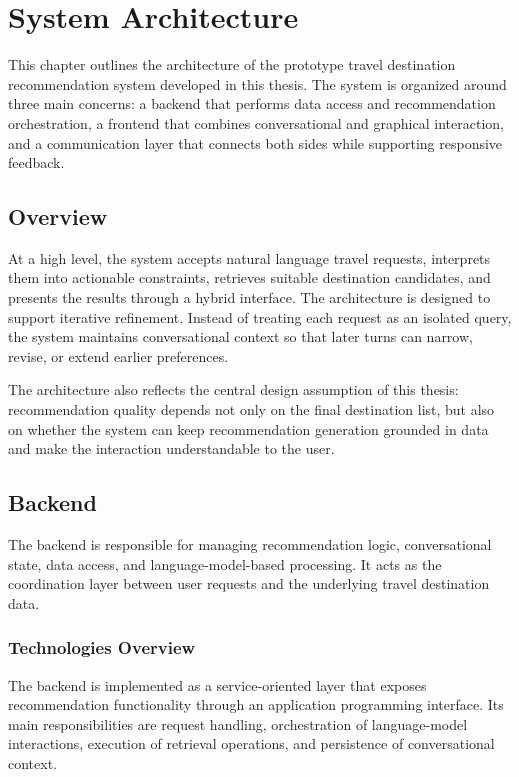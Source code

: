 
\chapter{System Architecture}\label{chapter:system-architecture}

This chapter outlines the architecture of the prototype travel destination recommendation system developed in this thesis. The system is organized around three main concerns: a backend that performs data access and recommendation orchestration, a frontend that combines conversational and graphical interaction, and a communication layer that connects both sides while supporting responsive feedback.

\section{Overview}\label{section:system-architecture:overview}
At a high level, the system accepts natural language travel requests, interprets them into actionable constraints, retrieves suitable destination candidates, and presents the results through a hybrid interface. The architecture is designed to support iterative refinement. Instead of treating each request as an isolated query, the system maintains conversational context so that later turns can narrow, revise, or extend earlier preferences.

The architecture also reflects the central design assumption of this thesis: recommendation quality depends not only on the final destination list, but also on whether the system can keep recommendation generation grounded in data and make the interaction understandable to the user.

\section{Backend}\label{section:system-architecture:backend}
The backend is responsible for managing recommendation logic, conversational state, data access, and language-model-based processing. It acts as the coordination layer between user requests and the underlying travel destination data.

\subsection{Technologies Overview}\label{subsection:system-architecture:backend-technologies}
The backend is implemented as a service-oriented layer that exposes recommendation functionality through an application programming interface. Its main responsibilities are request handling, orchestration of language-model interactions, execution of retrieval operations, and persistence of conversational context.

